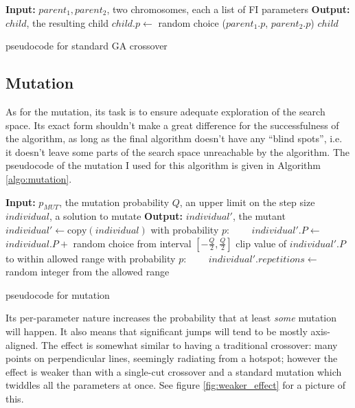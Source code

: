 \documentclass[times, utf8, diplomski]{fer}
\begin{document}
\begin{algorithm}
    \small
    \begin{algorithmic}
        \STATE \textbf{Input:} $parent_1, parent_2$, two chromosomes, each a list of FI parameters
        \STATE \textbf{Output:} $child$, the resulting child
            \STATE $child.p \gets $ random choice ($parent_1.p$, $parent_2.p$)
        \ENDFOR
        \RETURN $child$
    \end{algorithmic}
    \caption{pseudocode for standard GA crossover}
    \label{algo:standard_crossover}
\end{algorithm}


\subsection{Mutation}
As for the mutation, its task is to ensure adequate exploration of the search
space. Its exact form shouldn't make a great difference for the successfulness
of the algorithm, as long as the final algorithm doesn't have any ``blind spots'',
i.e. it doesn't leave some parts of the search space unreachable by the algorithm.
The pseudocode of the mutation I used for this algorithm is given in Algorithm \ref{algo:mutation}.

\begin{algorithm}[!htbp]
    \small
    \begin{algorithmic}
        \STATE \textbf{Input:} $p_{MUT}$, the mutation probability
        \STATE \textbf{\hphantom{Input:}} $Q$, an upper limit on the step size
        \STATE \textbf{\hphantom{Input:}} $individual$, a solution to mutate
        \STATE \textbf{Output:} $individual'$, the mutant
        \STATE $individual' \gets \text{copy}(individual)$
            \STATE with probability $p$:
            \STATE ~~~~$individual'.P \gets $ $individual.P + $ random choice from interval $[-\frac{Q}{2}, \frac{Q}{2}]$
            \STATE clip value of $individual'.P$ to within allowed range
        \ENDFOR
        \STATE with probability $p$:
        \STATE ~~~~$individual'.repetitions \gets $ random integer from the allowed range
    \end{algorithmic}
    \caption{pseudocode for mutation}
    \label{algo:mutation}
\end{algorithm}


Its per-parameter nature increases the probability that at least \emph{some}
mutation will happen. It also means that significant jumps will tend to be mostly
axis-aligned. The effect is somewhat similar to having a traditional crossover:
many points on perpendicular lines, seemingly radiating from a hotspot; however
the effect is weaker than with a single-cut crossover and a standard mutation
which twiddles all the parameters at once. See figure \ref{fig:weaker_effect}
for a picture of this.
\end{document}

